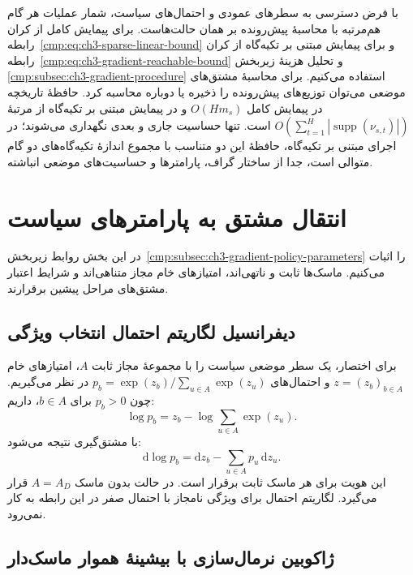 با فرض دسترسی به سطرهای عمودی و احتمال‌های
سیاست، شمار عملیات هر گام هم‌مرتبه با
محاسبهٔ پیش‌رونده بر همان حالت‌هاست.
برای پیمایش کامل از کران
رابطه~\eqref{cmp:eq:ch3-sparse-linear-bound}
و برای پیمایش مبتنی بر تکیه‌گاه از کران
رابطه~\eqref{cmp:eq:ch3-gradient-reachable-bound}
و تحلیل هزینهٔ زیربخش~
\ref{cmp:subsec:ch3-gradient-procedure}
استفاده می‌کنیم. برای محاسبهٔ مشتق‌های
موضعی می‌توان توزیع‌های پیش‌رونده را
ذخیره یا دوباره محاسبه کرد. حافظهٔ
تاریخچه در پیمایش کامل $O(Hm_s)$ و
در پیمایش مبتنی بر تکیه‌گاه از مرتبهٔ
$O(\sum_{t=1}^{H}|\operatorname{supp}(\nu_{s,t})|)$
است. تنها حساسیت جاری و بعدی نگهداری
می‌شوند؛ در اجرای مبتنی بر تکیه‌گاه،
حافظهٔ این دو متناسب با مجموع اندازهٔ
تکیه‌گاه‌های دو گام متوالی است، جدا از
ساختار گراف، پارامترها و حساسیت‌های
موضعی انباشته.

\section{انتقال مشتق به پارامترهای سیاست}
\label{app:ch3-gradient-policy-parameters}

در این بخش روابط
زیربخش~\ref{cmp:subsec:ch3-gradient-policy-parameters}
را اثبات می‌کنیم. ماسک‌ها ثابت و ناتهی‌اند،
امتیازهای خام مجاز متناهی‌اند و شرایط اعتبار
مشتق‌های مراحل پیشین برقرارند.

\subsection{دیفرانسیل لگاریتم احتمال انتخاب ویژگی}
\label{app:ch3-gradient-log-policy}

برای اختصار، یک سطر موضعی سیاست را با
مجموعهٔ مجاز ثابت $A$، امتیازهای خام
$z=(z_b)_{b\in A}$ و احتمال‌های
$p_b=\exp(z_b)/\sum_{u\in A}\exp(z_u)$
در نظر می‌گیریم. چون $p_b>0$ برای
$b\in A$، داریم:
\[
\log p_b=z_b-\log\sum_{u\in A}\exp(z_u).
\]
با مشتق‌گیری نتیجه می‌شود:
\begin{equation}\label{eq:app-ch3-gradient-log-policy-differential}
\boxed{
\mathrm d\log p_b
=\mathrm dz_b-\sum_{u\in A}p_u\,\mathrm dz_u.
}
\end{equation}
این هویت برای هر ماسک ثابت برقرار است.
در حالت بدون ماسک $A=A_D$ قرار می‌گیرد.
لگاریتم احتمال برای ویژگی نامجاز با
احتمال صفر در این رابطه به کار نمی‌رود.

\subsection{ژاکوبین نرمال‌سازی با بیشینهٔ هموار ماسک‌دار}
\label{app:ch3-gradient-masked-jacobian}

